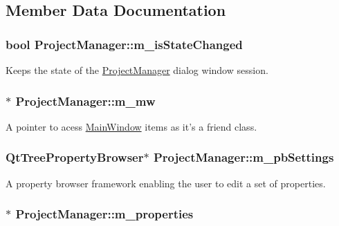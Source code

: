 \subsection{Member Data Documentation}
\hypertarget{classProjectManager_aa7cad9fe90b6a9bbaa0ae6d727d12e7c}{
\subsubsection[{m\-\_\-is\-State\-Changed}]{\setlength{\rightskip}{0pt plus 5cm}bool Project\-Manager\-::m\-\_\-is\-State\-Changed\hspace{0.3cm}{\ttfamily [private]}}}\label{classProjectManager_aa7cad9fe90b6a9bbaa0ae6d727d12e7c}
Keeps the state of the \hyperlink{classProjectManager}{Project\-Manager} dialog window session. \hypertarget{classProjectManager_a854e94a40ac35e0dc3fe45ef12ff855a}{
\subsubsection[{m\-\_\-mw}]{$\ast$ Project\-Manager\-::m\-\_\-mw\hspace{0.3cm}{\ttfamily [private]}}}\label{classProjectManager_a854e94a40ac35e0dc3fe45ef12ff855a}
A pointer to acess \hyperlink{classMainWindow}{Main\-Window} items as it's a friend class. \hypertarget{classProjectManager_a9c23c2284358dd111bc1b29f6ca6f611}{
\subsubsection[{m\-\_\-pb\-Settings}]{\setlength{\rightskip}{0pt plus 5cm}Qt\-Tree\-Property\-Browser$\ast$ Project\-Manager\-::m\-\_\-pb\-Settings\hspace{0.3cm}{\ttfamily [private]}}}\label{classProjectManager_a9c23c2284358dd111bc1b29f6ca6f611}
A property browser framework enabling the user to edit a set of properties. \hypertarget{classProjectManager_afa1e791a680f491f89aa215a5198f06a}{
\subsubsection[{m\-\_\-properties}]{$\ast$ Project\-Manager\-::m\-\_\-properties\hspace{0.3cm}{\ttfamily [private]}}}\label{classProjectManager_afa1e791a680f491f89aa215a5198f06a}
